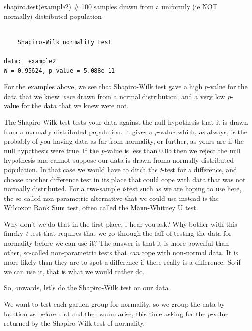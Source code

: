 \documentclass[
  letterpaper,
  DIV=11,
  numbers=noendperiod]{scrreprt}
\newenvironment{Shaded}{\begin{snugshade}}{\end{snugshade}}
\newcommand{\CommentTok}[1]{\textcolor[rgb]{0.37,0.37,0.37}{#1}}
\newcommand{\FunctionTok}[1]{\textcolor[rgb]{0.28,0.35,0.67}{#1}}
\newcommand{\NormalTok}[1]{\textcolor[rgb]{0.00,0.23,0.31}{#1}}
\begin{document}
\begin{Shaded}
\begin{Highlighting}[]
\FunctionTok{shapiro.test}\NormalTok{(example2) }\CommentTok{\# 100 samples drawn from a uniformly (ie NOT normally) distributed population}
\end{Highlighting}
\end{Shaded}

\begin{verbatim}

    Shapiro-Wilk normality test

data:  example2
W = 0.95624, p-value = 5.088e-11
\end{verbatim}

For the examples above, we see that Shapiro-Wilk test gave a high
\emph{p}-value for the data that we knew \emph{were} drawn from a normal
distribution, and a very low \emph{p}-value for the data that we knew
were not.

The Shapiro-Wilk test tests your data against the null hypothesis that
it is drawn from a normally distributed population. It gives a
\emph{p}-value which, as always, is the probably of you having data as
far from normality, or further, as yours are if the null hypothesis were
true. If the \emph{p}-value is less than 0.05 then we reject the null
hypothesis and cannot suppose our data is drawn froma normally
distributed population. In that case we would have to ditch the
\emph{t}-test for a difference, and choose another difference test in
its place that could cope with data that was not normally distributed.
For a two-sample \emph{t}-test such as we are hoping to use here, the
so-called non-parametric alternative that we could use instead is the
Wilcoxon Rank Sum test, often called the Mann-Whitney U test.

Why don't we do that in the first place, I hear you ask? Why bother with
this finicky \emph{t}-test that requires that we go through the faff of
testing the data for normality before we can use it? The answer is that
it is more powerful than other, so-called non-parametric tests that
\emph{can} cope with non-normal data. It is more likely than they are to
spot a difference if there really is a difference. So if we can use it,
that is what we would rather do.

So, onwards, let's do the Shapiro-Wilk test on our data

We want to test each garden group for normality, so we group the data by
location as before and and then summarise, this time asking for the
\emph{p}-value returned by the Shapiro-Wilk test of normality.
\end{document}
